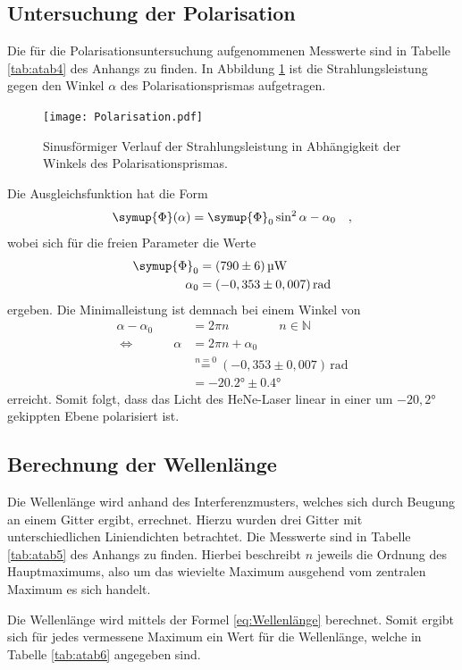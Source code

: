 \subsection{Untersuchung der Polarisation}
Die für die Polarisationsuntersuchung aufgenommenen Messwerte sind in Tabelle \ref{tab:atab4} des Anhangs zu finden. 
In Abbildung \ref{fig:afig4} ist die Strahlungsleistung gegen den Winkel $\alpha$ des Polarisationsprismas aufgetragen.
\noindent
\FloatBarrier
\begin{figure}[h]
\centering
\texttt{[image: Polarisation.pdf]}
\caption{Sinusförmiger Verlauf der Strahlungsleistung in Abhängigkeit der Winkels des Polarisationsprismas.}
\label{fig:afig4}
\end{figure}
\FloatBarrier
Die Ausgleichsfunktion hat die Form
\begin{equation}
\symup{\Phi}(\alpha) = \symup{\Phi}_0 \sin^2{\alpha-\alpha_0} \quad ,
\end{equation}
wobei sich für die freien Parameter die Werte
\begin{align}
\symup{\Phi}_0 & = (790\pm 6)\, \si{\micro\watt}\\
\alpha_0 &= (-0,353\pm 0,007)\, \mathrm{rad}
\end{align}
ergeben. 
Die Minimalleistung ist demnach bei einem Winkel von
\begin{align}
\alpha - \alpha_0 &= 2\pi n \qquad \qquad n \in \mathbb{N} \\
\Leftrightarrow \qquad \quad \alpha &=  2\pi n + \alpha_0 \\
&\stackrel{n = 0}{=} (-0,353\pm 0,007)\, \mathrm{rad} \\
&= -20.2° \pm 0.4°
\end{align}
erreicht. Somit folgt, dass das Licht des HeNe-Laser linear in einer um $-20,2°$ gekippten Ebene polarisiert ist.

\subsection{Berechnung der Wellenlänge}
Die Wellenlänge wird anhand des Interferenzmusters, welches sich durch Beugung an einem Gitter ergibt, errechnet.
Hierzu wurden drei Gitter mit unterschiedlichen Liniendichten betrachtet.
Die Messwerte sind in Tabelle \ref{tab:atab5} des Anhangs zu finden. 
Hierbei beschreibt $n$ jeweils die Ordnung des Hauptmaximums, also um das wievielte Maximum ausgehend vom zentralen Maximum es sich handelt.

Die Wellenlänge wird mittels der Formel \eqref{eq:Wellenlänge} berechnet.
Somit ergibt sich für jedes vermessene Maximum ein Wert für die Wellenlänge, welche in Tabelle \ref{tab:atab6} angegeben sind.

